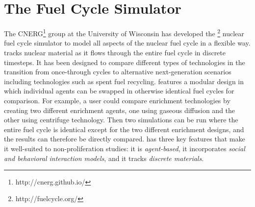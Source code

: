 \section{The \Cyclus Fuel Cycle Simulator}
\label{s_methods}

The \gls{CNERG}\footnote{http://cnerg.github.io/} group at the University of Wisconsin has developed the \Cyclus\footnote{http://fuelcycle.org/} nuclear fuel cycle simulator to model all aspects of the nuclear fuel cycle in a flexible way\cite{cyclus_v1_0,cyclus_v1_2,cyclus_v1_3}.  \Cyclus tracks nuclear material as it flows through the entire fuel cycle in discrete timesteps. It has been designed to compare different types of technologies in the transition from once-through cycles to alternative next-generation scenarios including technologies such as spent fuel recycling. \Cyclus features a modular design in which individual agents can be swapped in otherwise identical fuel cycles for comparison. For example, a user could compare enrichment technologies by creating two different enrichment agents, one using gaseous diffusion and the other using centrifuge technology. Then two simulations can be run where the entire fuel cycle is identical except for the two different enrichment designs, and the results can therefore be directly compared.  \Cyclus has three key features that make it well-suited to non-proliferation studies: it is \textit{agent-based}, it incorporates \textit{social and behavioral interaction models}, and it tracks \textit{discrete materials}.

